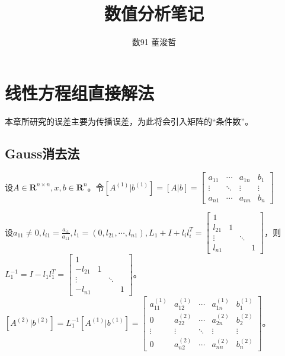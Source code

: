 \documentclass{ctexart}
\title{数值分析笔记}
\author{数91 董浚哲}
\begin{document}
\maketitle
\newcommand{\R}{\mathbf{R}}
\newcommand{\dd}{\,\mathrm{d}}
\newcommand{\st}{\text{ s.t. }}
\newcommand{\pp}[2]{\frac{\partial #1}{\partial #2}}
\newcommand{\fl}{\mathrm{fl}}


\newtheorem{Thm}{定理}[section]
\newtheorem{Lemma}[Thm]{引理}
\newtheorem{Prop}[Thm]{命题}
\newtheorem{Cor}[Thm]{推论}
\newtheorem{Def}{定义}[section]
\newtheorem{Rmk}{注}[section]
\newtheorem{Eg}{例}[section]
\newenvironment{solution}{\begin{proof}[Solution]}{\end{proof}}

\section{线性方程组直接解法}
本章所研究的误差主要为传播误差，为此将会引入矩阵的“条件数”。
\subsection{Gauss消去法}

设$A\in \R^{n\times n},x,b\in \R^n$。令$[A^{(1)}|b^{(1)}]=[A|b]=
\begin{bmatrix}
a_{11}&\cdots&a_{1n}&b_1\\
\vdots&\ddots&\vdots&\vdots\\
a_{n1}&\cdots&a_{nn}&b_n
\end{bmatrix}$

设$a_{11}\neq 0,l_{i1}=\frac{a_{i1}}{a_{11}},l_1=(0,l_{21},\cdots,l_{n1}),L_1+I+l_il_i^T=
\begin{bmatrix}
1& & & \\
l_{21}&1& & \\
\vdots& &\ddots&\\
l_{n1}& & &1
\end{bmatrix}
$，则$L_1^{-1}=I-l_1l_1^T=\begin{bmatrix}
1& & & \\
-l_{21}&1& & \\
\vdots& &\ddots&\\
-l_{n1}& & &1
\end{bmatrix}$。$[A^{(2)}|b^(2)]=L_1^{-1}[A^{(1)}|b^{(1)}]=
\begin{bmatrix}
a_{11}^{(1)}&a_{12}^{(1)}&\cdots&a_{1n}^{(1)}&b_1^{(1)}\\
0&a^{(2)}_{22}&\cdots&a^{(2)}_{2n}&b_2^{(2)}\\
\vdots&\vdots&\ddots&\vdots&\vdots\\
0&a^{(2)}_{n2}&\cdots&a^{(2)}_{nn}&b_n^{(2)}
\end{bmatrix}$。
\end{document}
